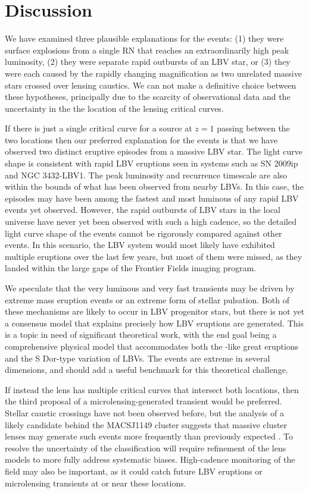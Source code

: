 \section{Discussion}\label{sec:Discussion}

We have examined three plausible explanations for the \spock events:
(1) they were surface explosions from a single RN that reaches an
extraordinarily high peak luminosity, (2) they were separate rapid
outbursts of an LBV star, or (3) they were each caused by the rapidly
changing magnification as two unrelated massive stars crossed over
lensing caustics. We can not make a definitive choice between these
hypotheses, principally due to the scarcity of observational data and
the uncertainty in the the location of the lensing critical curves.

If there is just a single critical curve for a source at $z=1$ passing
between the two \spock locations then our preferred explanation for
the \spock events is that we have observed two distinct eruptive
episodes from a massive LBV star.  The light curve shape is consistent
with rapid LBV eruptions seen in systems such as SN 2009ip and NGC
3432-LBV1.  The peak luminosity and recurrence timescale are also
within the bounds of what has been observed from nearby LBVs.  In this
case, the \spock episodes may have been among the fastest and most
luminous of any rapid LBV events yet observed. However, the rapid
outbursts of LBV stars in the local universe have never yet been
observed with such a high cadence, so the detailed light curve shape
of the \spock events cannot be rigorously compared against other
events.  In this scenario, the \spock LBV system would most likely
have exhibited multiple eruptions over the last few years, but most of
them were missed, as they landed within the large gaps of the \HST
Frontier Fields imaging program.

We speculate that the very luminous and very fast \spock transients
may be driven by extreme mass eruption events or an extreme form of
stellar pulsation.  Both of these mechanisms are likely to occur in
LBV progenitor stars, but there is not yet a consensus model that
explains precisely how LBV eruptions are generated. This is a topic in
need of significant theoretical work, with the end goal being a
comprehensive physical model that accommodates both the \etacar-like
great eruptions and the S Dor-type variation of LBVs.  The \spock
events are extreme in several dimensions, and should add a useful
benchmark for this theoretical challenge.

If instead the  lens has multiple critical curves that
intersect both \spock locations, then the third proposal of a
microlensing-generated transient would be preferred.  Stellar caustic
crossings have not been observed before, but the analysis of a likely
candidate behind the MACSJ1149 cluster suggests that massive cluster
lenses may generate such events more frequently than previously
expected \citep{Kelly:2017}. To resolve the uncertainty of the \spock
classification will require refinement of the lens models to more
fully address systematic biases.  High-cadence monitoring of the
 field may also be important, as it could catch future LBV
eruptions or microlensing transients at or near these locations.

